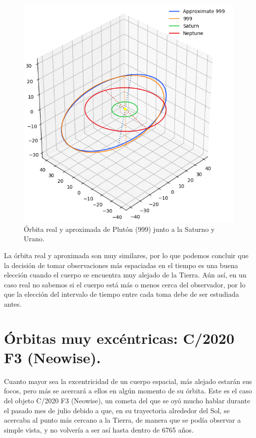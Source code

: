 \begin{figure}[H]
\centering
\includegraphics[scale=0.35]{images/plot_pluto_ok.png}
\caption{Órbita real y aproximada de Plutón (999) junto a la Saturno y Urano.}
\label{fig:plot_pluto_ok}
\end{figure}

La órbita real y aproximada son muy similares, por lo que podemos concluir que la decisión de tomar observaciones más espaciadas en el tiempo es una buena elección cuando el cuerpo se encuentra muy alejado de la Tierra. Aún así, en un caso real no sabemos si el cuerpo está más o menos cerca del observador, por lo que la elección del intervalo de tiempo entre cada toma debe de ser estudiada antes.\\



\section{Órbitas muy excéntricas: C/2020 F3 (Neowise).}
\label{sec:neowise}
Cuanto mayor sea la excentricidad de un cuerpo espacial, más alejado estarán sus focos, pero más se acercará a ellos en algún momento de su órbita. Este es el caso del objeto C/2020 F3 (Neowise), un cometa del que se oyó mucho hablar durante el pasado mes de julio debido a que, en su trayectoria alrededor del Sol, se acercaba al punto más cercano a la Tierra, de manera que se podía observar a simple vista, y no volvería a ser así hasta dentro de 6765 años.\\


